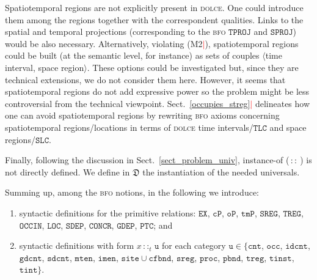 \documentclass[ao]{iosart2x}
\newcommand{\nb}[1]{\textcolor{red}{$|$}\marginpar{\hspace*{-0cm}\parbox{20mm}{\scriptsize\raggedright\textcolor{red}{#1}}}}
\newcommand{\bfoAxLabel}{\textrm{a$_\texttt{b}$}}
\newcommand{\refbfoax}[1]{({\bfoAxLabel}\ref{#1})}
\newcommand{\pr}[1]{\mathtt{#1}}
\newcommand{\cn}[1]{\mathtt{#1}}
\newcommand{\dolce}{{\textsc{dolce}}}
\newcommand{\bfo}{{\textsc{bfo}}}
\newcommand {\thdolce} {\ensuremath{\mathfrak{D}}}
\newcommand {\SLCd} {\ensuremath{\pr{SLC}}}
\newcommand {\TLCd} {\ensuremath{\pr{TLC}}}
\newcommand{\cntbcat}{\cn{cnt}}
\newcommand{\idcntbcat}{\cn{idcnt}}
\newcommand{\gdcntbcat}{\cn{gdcnt}}
\newcommand{\sdcntbcat}{\cn{sdcnt}}
\newcommand{\mtenbcat}{\cn{mten}}
\newcommand{\imenbcat}{\cn{imen}}
\newcommand{\sitebcat}{\cn{site}}
\newcommand{\cfbndbcat}{\cn{cfbnd}}
\newcommand{\sregbcat}{\cn{sreg}}
\newcommand{\occbcat}{\cn{occ}}
\newcommand{\procbcat}{\cn{proc}}
\newcommand{\pbndbcat}{\cn{pbnd}}
\newcommand{\tregbcat}{\cn{treg}}
\newcommand{\stregbcat}{\cn{streg}}
\newcommand{\tinstbcat}{\cn{tinst}}
\newcommand{\tintbcat}{\cn{tint}}
\newcommand{\bfocpart}{\pr{cP}}
\newcommand{\bfoopart}{\pr{oP}}
\newcommand{\bfotpart}{\pr{tmP}}
\newcommand{\bfoexist}{\pr{EX}}
\newcommand{\bfoiof}[1]{{\,::_{#1\:\!}}}
\newcommand{\bfosdep}{\pr{SDEP}}
\newcommand{\bfogdep}{\pr{GDEP}}
\newcommand{\bfooccurs}{\pr{OCCIN}}
\newcommand{\bfolocated}{\pr{LOC}}
\newcommand{\bfosregof}{\pr{SREG}}
\newcommand{\bfotregof}{\pr{TREG}}
\newcommand{\bfoparticin}{\pr{PTC}}
\newcommand{\bfoconcr}{\pr{CONCR}}
\newcommand{\bfotproj}{\pr{TPROJ}}
\newcommand{\bfosproj}{\pr{SPROJ}}
\begin{document}
Spatiotemporal regions are not explicitly present in {\dolce}. One could introduce them among the regions together with the correspondent qualities. Links to the spatial and temporal projections (corresponding to the {\bfo} $\bfotproj$ and $\bfosproj$) would be also necessary.
Alternatively, violating (M2\nb{FC: M3?}), spatiotemporal regions could be built (at the semantic level, for instance) as sets of couples $\langle$time interval, space region$\rangle$. 
%
These options could be investigated but, since they are 
technical extensions, we do not consider them here. However, it seems that spatiotemporal regions do not add expressive power so the problem might be less controversial from the technical viewpoint. %
Sect.~\ref{occupies_streg}\nb{FC: sezione vecchia da decidere cosa fare} delineates how one can avoid spatiotemporal regions by rewriting {\bfo} axioms concerning spatiotemporal regions/locations in terms of {\dolce} time intervals/$\TLCd$ and space regions/$\SLCd$.

Finally, following the discussion in Sect.~\ref{sect_problem_univ}, instance-of ($\bfoiof{}$) is not directly defined. We define in $\thdolce$ the instantiation of the needed universals.

\smallskip
Summing up, among the {\bfo} notions, in the following we introduce: 
\begin{enumerate}[$(i)$]
\item syntactic definitions for the primitive relations: $\bfoexist$, $\bfocpart$, $\bfoopart$, $\bfotpart$, $\bfosregof$, $\bfotregof$, $\bfooccurs$, $\bfolocated$, $\bfosdep$, $\bfoconcr$, $\bfogdep$, $\bfoparticin$; and 
\item syntactic definitions with form $x \bfoiof{t} \cn{u}$ for each category $\cn{u} \in \{\cntbcat$, $\occbcat$, $\idcntbcat$, $\gdcntbcat$, $\sdcntbcat$, $\mtenbcat$, $\imenbcat$, $\sitebcat{\cup}\cfbndbcat$, $\sregbcat$, $\procbcat$, $\pbndbcat$, $\tregbcat$, $\tinstbcat$, $\tintbcat\}$.
\end{enumerate}

\end{document}
